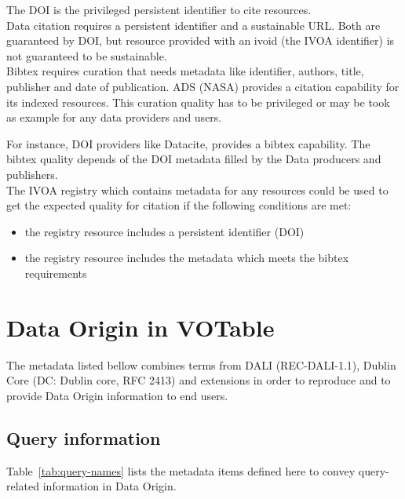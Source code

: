 \documentclass[11pt,a4paper]{ivoa}
\begin{document}
The DOI is the privileged persistent identifier to cite resources.\\

Data citation requires a persistent identifier and a sustainable URL. 
Both are guaranteed by DOI, but resource provided with an ivoid (the IVOA identifier) 
is not guaranteed to be sustainable.\\

Bibtex requires curation that needs metadata like identifier, authors, title, publisher and date of publication.
ADS (NASA) provides a citation capability for its indexed resources. This curation quality has to be privileged or may be took as example for any data providers and users.

For instance, DOI providers like Datacite, provides a bibtex capability. The bibtex quality depends of the DOI metadata filled by the Data producers and publishers.\\

The IVOA registry which contains metadata for any resources could be used to get the expected quality for citation if the following conditions are met:
\begin{itemize}
\item the registry resource includes a persistent identifier (DOI)
\item the registry resource includes the metadata which meets the bibtex requirements
\end{itemize}



\section{Data Origin in VOTable}
\label{sec:data-origin-in-votable}
The metadata listed bellow combines terms from DALI (REC-DALI-1.1), Dublin Core (DC: Dublin core, RFC 2413) and extensions in order to reproduce and to provide Data Origin information to end users.

\subsection{Query information}
Table~\ref{tab:query-names} lists the metadata items defined here to
convey query-related information in Data Origin.
\end{document}

